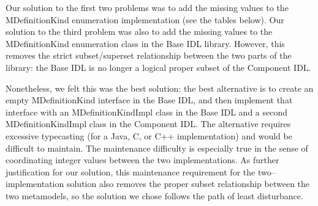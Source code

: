 Our solution to the first two problems was to add the missing values to the
MDefinitionKind enumeration implementation (see the tables below). Our solution
to the third problem was also to add the missing values to the MDefinitionKind
enumeration class in the Base IDL library. However, this removes the strict
subset/superset relationship between the two parts of the library: the Base IDL
is no longer a logical proper subset of the Component IDL.

Nonetheless, we felt this was the best solution: the best alternative is to
create an empty MDefinitionKind interface in the Base IDL, and then implement
that interface with an MDefinitionKindImpl class in the Base IDL and a second
MDefinitionKindImpl class in the Component IDL. The alternative requires
excessive typecasting (for a Java, C, or C++ implementation) and would be
difficult to maintain. The maintenance difficulty is especially true in the
sense of coordinating integer values between the two implementations. As further
justification for our solution, this maintenance requirement for the
two--implementation solution also removes the proper subset relationship between
the two metamodels, so the solution we chose follows the path of least
disturbance.

